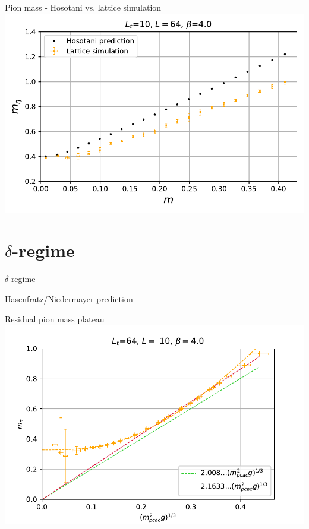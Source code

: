 \documentclass[english]{beamer}
\begin{document}
\begin{frame}{Pion mass - Hosotani vs. lattice simulation}
  \includegraphics[width=1\textwidth]{figs/Meta64x10FiniteT}
\end{frame}

\section{$\delta$-regime}

\begin{frame}{$\delta$-regime}
\end{frame}

\begin{frame}{Hasenfratz/Niedermayer prediction}
\end{frame}

\begin{frame}{Residual pion mass plateau}
  \includegraphics[width=1\textwidth]{figs/Mpi10x64}
\end{frame}
\end{document}
